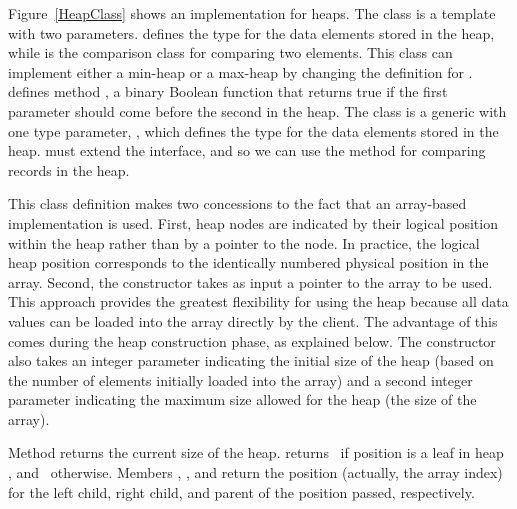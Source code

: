 \begin{figure}
\vspace{-\smallskipamount}
\captcont
{}
\end{figure}

Figure~\ref{HeapClass} shows an implementation for
heaps.
{The class is a template with two parameters.
 defines the type for the data elements stored in the heap, 
while  is the comparison class for comparing two elements.
This class can implement either a min-heap or a max-heap by changing
the definition for .
 defines method , a binary Boolean function
that returns true if the first parameter should come before the second
in the heap.}{}
{The class is a generic with one type parameter, ,
which defines the type for the data elements stored in the heap.
 must extend the  interface,
and so we can use the  method for comparing records in
the heap.}{}

This class definition makes two concessions to the fact that an
array-based implementation is used.
First, heap nodes are indicated by their logical position within the
heap rather than by a pointer to the node.
In practice, the logical heap position corresponds to the identically
numbered physical position in the array.
Second, the constructor takes as input a pointer to the array to be
used.
This approach provides the greatest flexibility for using the heap
because all data values can be loaded into the array directly
by the client.
The advantage of this comes during the heap construction phase,
as explained below.
The constructor also takes an integer parameter indicating the initial
size of the heap (based on the number of elements initially loaded
into the array) and a second integer parameter indicating the maximum
size allowed for the heap (the size of the array).

Method  returns the current size of the heap.
 returns \TRUE\ if position
 is a leaf in heap , and \FALSE\ otherwise.
Members , , and  return
the position (actually, the array index) for the left child, right
child, and parent of the position passed, respectively.

